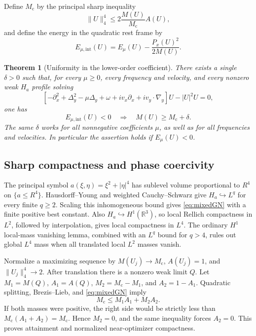 \documentclass[11pt]{article}
\newtheorem{theorem}{Theorem}[section]
\theoremstyle{definition}
\theoremstyle{remark}
\newcommand{\R}{\mathbb R}
\newcommand{\norm}[1]{\lVert #1\rVert}
\newcommand{\mc}{M_{\mathrm c}}
\begin{document}
Define $\mc$ by the principal sharp inequality
\begin{equation}\label{eq:mixedGN}
 \norm U_4^4\le2\frac{M(U)}{\mc}A(U),
\end{equation}
and define the energy in the quadratic rest frame by
\begin{equation}\label{eq:internal}
 E_{\mu,\mathrm{int}}(U)=E_\mu(U)-\frac{P_x(U)^2}{2M(U)}.
\end{equation}

\begin{theorem}[Uniformity in the lower-order coefficient]\label{thm:mixed}
There exists a single $\delta>0$ such that, for every $\mu\ge0$, every frequency and velocity, and every nonzero weak $H_a$ profile solving
\begin{equation}\label{eq:mixedprofile}
 [-\partial_x^2+\Delta_y^2-\mu\Delta_y+\omega
       +iv_x\partial_x+iv_y\cdot\nabla_y]U-|U|^2U=0,
\end{equation}
one has
\[
 E_{\mu,\mathrm{int}}(U)<0\quad\Longrightarrow\quad
 M(U)\ge\mc+\delta.
\]
The same $\delta$ works for all nonnegative coefficients $\mu$, as well as for all frequencies and velocities. In particular the assertion holds if $E_\mu(U)<0$.
\end{theorem}

\subsection{Sharp compactness and phase coercivity}

The principal symbol $a(\xi,\eta)=\xi^2+|\eta|^4$ has sublevel volume proportional to $R^4$ on $\{a\le R^4\}$. Hausdorff--Young and weighted Cauchy--Schwarz give $H_a\hookrightarrow L^q$ for every finite $q\ge2$. Scaling this inhomogeneous bound gives \eqref{eq:mixedGN} with a finite positive best constant. Also $H_a\hookrightarrow H^1(\R^3)$, so local Rellich compactness in $L^2$, followed by interpolation, gives local compactness in $L^4$. The ordinary $H^1$ local-mass vanishing lemma, combined with an $L^q$ bound for $q>4$, rules out global $L^4$ mass when all translated local $L^2$ masses vanish.

Normalize a maximizing sequence by $M(U_j)\to\mc$, $A(U_j)=1$, and $\norm{U_j}_4^4\to2$. After translation there is a nonzero weak limit $Q$. Let $M_1=M(Q)$, $A_1=A(Q)$, $M_2=\mc-M_1$, and $A_2=1-A_1$. Quadratic splitting, Brezis--Lieb, and \eqref{eq:mixedGN} imply
\[
 \mc\le M_1A_1+M_2A_2.
\]
If both masses were positive, the right side would be strictly less than $\mc(A_1+A_2)=\mc$. Hence $M_2=0$, and the same inequality forces $A_2=0$. This proves attainment and normalized near-optimizer compactness.
\end{document}
